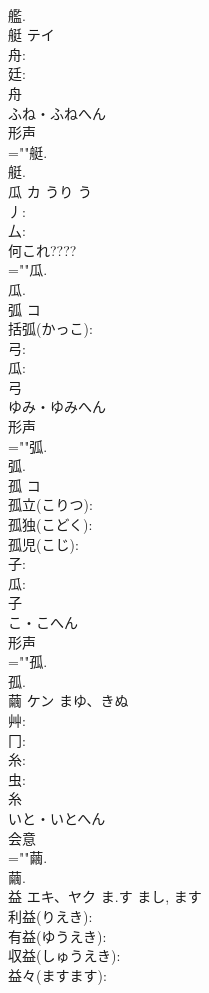 \documentclass[8pt]{extreport}
\begin{document}
\begin{CJK}{UTF8}{min}
\\	艦.
\\	艇	テイ			
\\	舟: 
\\	廷: 
\\	舟	
\\	ふね・ふねへん	
\\	形声 
\\	=""艇.
\\	艇.
\\	瓜	カ	うり	う	
\\	丿: 
\\	厶: 
\\	何これ???? 
\\	=""瓜.
\\	瓜.
\\	弧	コ			
\\	括弧(かっこ): 
\\	弓: 
\\	瓜: 
\\	弓	
\\	ゆみ・ゆみへん	
\\	形声 
\\	=""弧.
\\	弧.
\\	孤	コ			
\\	孤立(こりつ): 
\\	孤独(こどく): 
\\	孤児(こじ): 
\\	子: 
\\	瓜: 
\\	子	
\\	こ・こへん	
\\	形声 
\\	=""孤.
\\	孤.
\\	繭	ケン	まゆ、きぬ		
\\	艸: 
\\	冂: 
\\	糸: 
\\	虫: 
\\	糸	
\\	いと・いとへん	
\\	会意 
\\	=""繭.
\\	繭.
\\	益	エキ、ヤク	ま.す	まし, ます	
\\	利益(りえき): 
\\	有益(ゆうえき): 
\\	収益(しゅうえき): 
\\	益々(ますます): 

\end{CJK}
\end{document}

